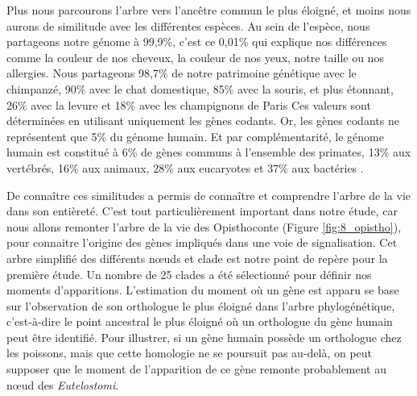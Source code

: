 \par Plus nous parcourons l’arbre vers l’ancêtre commun le plus éloigné, et moins nous aurons de similitude avec les différentes espèces. Au sein de l’espèce, nous partageons notre génome à 99,9\%, c’est ce 0,01\% qui explique nos différences comme la couleur de nos cheveux, la couleur de nos yeux, notre taille ou nos allergies. Nous partageons 98,7\% de notre patrimoine génétique avec le chimpanzé, 90\% avec le chat domestique, 85\% avec la souris, et plus étonnant, 26\% avec la levure et 18\% avec les champignons de Paris \parencite{roy_biotechnology_2010} Ces valeurs sont déterminées en utilisant uniquement les gènes codants. Or, les gènes codants ne représentent que 5\% du génome humain. Et par complémentarité, le génome humain est constitué à 6\% de gènes communs à l’ensemble des primates, 13\% aux vertébrés, 16\% aux animaux, 28\% aux eucaryotes et 37\% aux bactéries \parencite{domazet-loso_ancient_2008, mcfall-ngai_animals_2013}.
\par De connaître ces similitudes a permis de connaître et comprendre l’arbre de la vie dans son entièreté. C’est tout particulièrement important dans notre étude, car nous allons remonter l’arbre de la vie des Opisthoconte (Figure \ref{fig:8_opistho}), pour connaitre l’origine des gènes impliqués dans une voie de signalisation. Cet arbre simplifié des différents nœuds et clade est notre point de repère pour la première étude. Un nombre de 25 clades a été sélectionné pour définir nos moments d’apparitions. L'estimation du moment où un gène est apparu se base sur l'observation de son orthologue le plus éloigné dans l'arbre phylogénétique, c'est-à-dire le point ancestral le plus éloigné où un orthologue du gène humain peut être identifié. Pour illustrer, si un gène humain possède un orthologue chez les poissons, mais que cette homologie ne se poursuit pas au-delà, on peut supposer que le moment de l'apparition de ce gène remonte probablement au nœud des \textit{Eutelostomi}.

